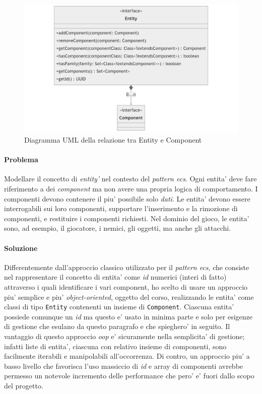 \documentclass[a4paper,12pt]{report}
\begin{document}
\begin{figure}[h]
	\centering
	\includegraphics[width=\textwidth]{uml/uml_entity_component.png}
	\caption{Diagramma UML della relazione tra Entity e Component}
\end{figure}

\paragraph{Problema}
Modellare il concetto di \textit{entity'} nel contesto del \textit{pattern ecs}. Ogni entita' deve fare riferimento a dei \textit{component} ma non avere una propria logica di comportamento. I componenti devono contenere il piu' possibile solo \textit{dati}. Le entita' devono essere interrogabili sui loro componenti, supportare l'inserimento e la rimozione di componenti, e restituire i componenti richiesti. Nel dominio del gioco, le entita' sono, ad esempio, il giocatore, i nemici, gli oggetti, ma anche gli attacchi.

\paragraph*{Soluzione}
Differentemente dall'approccio classico utilizzato per il \textit{pattern ecs}, che consiste nel rappresentare il concetto di entita' come \textit{id} numerici (interi di fatto) attraverso i quali identificare i vari component, ho scelto di usare un approccio piu' semplice e piu' \textit{object-oriented}, oggetto del corso, realizzando le entita' come classi di tipo \texttt{Entity} contenenti un insieme di \texttt{Component}. Ciascuna entita' possiede comunque un \textit{id} ma questo e' usato in minima parte e solo per esigenze di gestione che esulano da questo paragrafo e che spieghero' in seguito. 
Il vantaggio di questo approccio \textit{oop} e' sicuramente nella semplicita' di gestione; infatti liste di entita', ciascuna con relativo insieme di componenti, sono facilmente iterabili e manipolabili all'occorrenza. Di contro, un approccio piu' a basso livello che favorisca l'uso massiccio di \textit{id} e array di componenti avrebbe permesso un notevole incremento delle performance che pero' e' fuori dallo scopo del progetto.
\end{document}
